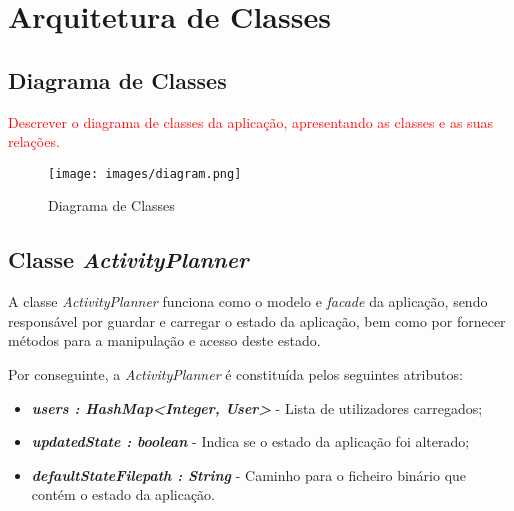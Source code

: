 \documentclass[a4paper,12pt]{scrreprt}
\begin{document}
\tableofcontents
\pagebreak
\listoffigures
\pagebreak




\chapter{Arquitetura de Classes}
\section{Diagrama de Classes}
\textcolor{red}{
    Descrever o diagrama de classes da aplicação, apresentando as classes e as suas relações.
}


\begin{figure}[!ht]
    \centering
    \texttt{[image: images/diagram.png]}
    \caption{Diagrama de Classes}
    \label{fig:diagrama-classes}
\end{figure}


\section{Classe \textit{ActivityPlanner}}
    A classe \textit{ActivityPlanner} funciona como o modelo e \textit{facade} da aplicação,
    sendo responsável por guardar e carregar o estado da aplicação,
    bem como por fornecer métodos para a manipulação e acesso deste estado.

    Por conseguinte, a \textit{ActivityPlanner} é constituída pelos seguintes atributos:

    \begin{itemize}
        \item \textit{\textbf{users : HashMap<Integer, User>}} - Lista de utilizadores carregados;
        \item \textit{\textbf{updatedState : boolean}} - Indica se o estado da aplicação foi alterado;
        \item \textit{\textbf{defaultStateFilepath : String}} - Caminho para o ficheiro binário que contém o estado da aplicação.
    \end{itemize}
\end{document}

